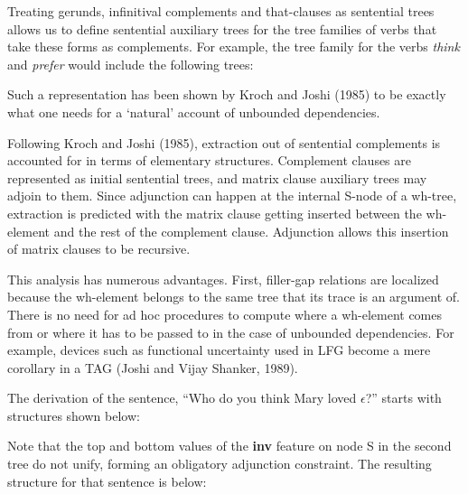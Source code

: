 Treating gerunds, infinitival complements and that-clauses as sentential
trees allows us to define sentential auxiliary trees for the tree families
 of verbs that take these forms as complements.
For example, the tree family for the verbs {\it think} and  {\it prefer}
 would include the following trees:


\noindent Such a representation has been shown by Kroch and Joshi (1985)\nocite{kj85}  
to be exactly what one needs for a `natural' account of unbounded dependencies.

Following Kroch and Joshi (1985), extraction out of sentential complements is accounted for in terms of 
elementary structures. Complement clauses are represented as initial sentential trees, and matrix clause auxiliary
trees may adjoin to them. Since adjunction can happen at the internal S-node of a wh-tree, extraction is predicted with the 
matrix clause getting inserted between the wh-element and the rest
of the complement clause. Adjunction allows this insertion of matrix clauses to
be recursive. 

This analysis has numerous advantages. First, filler-gap relations are localized because the wh-element 
belongs to the same tree that its trace is an argument of. There is no need for ad hoc procedures to compute
where a wh-element comes from or where it has to be passed to in the case of unbounded dependencies.
 For example, devices such as functional uncertainty used in LFG become a mere corollary in a 
TAG (Joshi and Vijay Shanker, 1989)\nocite{jv89}.

\noindent The derivation of the sentence, 
``Who do you think Mary loved $\epsilon$?''
starts with structures shown below:


Note that the top and bottom values of the {\bf inv} feature
on node S in the second tree do not unify,
forming an obligatory adjunction constraint.
The resulting structure for that sentence is below:

